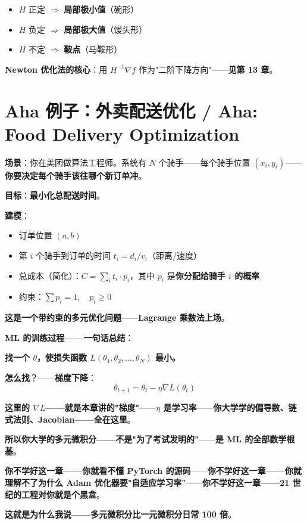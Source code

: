 \begin{itemize}
\item $H$ 正定 $\Rightarrow$ \textbf{局部极小值}（碗形）
\item $H$ 负定 $\Rightarrow$ \textbf{局部极大值}（馒头形）
\item $H$ 不定 $\Rightarrow$ \textbf{鞍点}（马鞍形）
\end{itemize}

\textbf{Newton 优化法的核心}：用 $H^{-1} \nabla f$ 作为"二阶下降方向"——\textbf{见第 13 章}。

\section{Aha 例子：外卖配送优化 / Aha: Food Delivery Optimization}

\textbf{场景}：你在美团做算法工程师。系统有 $N$ 个骑手——每个骑手位置 $(x_i, y_i)$——\textbf{你要决定每个骑手该往哪个新订单冲}。

\textbf{目标}：\textbf{最小化总配送时间}。

\textbf{建模}：

\begin{itemize}
\item 订单位置 $(a, b)$
\item 第 $i$ 个骑手到订单的时间 $t_i = d_i / v_i$（距离/速度）
\item 总成本（简化）：$C = \sum_i t_i \cdot p_i$，其中 $p_i$ 是\textbf{你分配给骑手 $i$ 的概率}
\item 约束：$\sum p_i = 1, \quad p_i \geq 0$
\end{itemize}

\textbf{这是一个带约束的多元优化问题}——\textbf{Lagrange 乘数法上场}。

\begin{tcolorbox}[ahabox={Aha: 多元微积分就是 ML 的全部}]
\textbf{ML 的训练过程——一句话总结}：

\medskip

\textbf{找一个 $\theta$，使损失函数 $L(\theta_1, \theta_2, \ldots, \theta_N)$ 最小。}

\medskip

\textbf{怎么找}？——\textbf{梯度下降}：
\[
\theta_{t+1} = \theta_t - \eta \nabla L(\theta_t)
\]

\medskip

\textbf{这里的 $\nabla L$——就是本章讲的"梯度"}——\textbf{$\eta$ 是学习率}——\textbf{你大学学的偏导数、链式法则、Jacobian——全在这里}。

\medskip

\textbf{所以你大学的多元微积分——不是"为了考试发明的"}——\textbf{是 ML 的全部数学根基}。

\medskip

\textbf{你不学好这一章——你就看不懂 PyTorch 的源码}——\textbf{你不学好这一章——你就理解不了为什么 Adam 优化器要"自适应学习率"}——\textbf{你不学好这一章——21 世纪的工程对你就是个黑盒}。

\medskip

\textbf{这就是为什么我说——多元微积分比一元微积分日常 100 倍}。
\end{tcolorbox}

